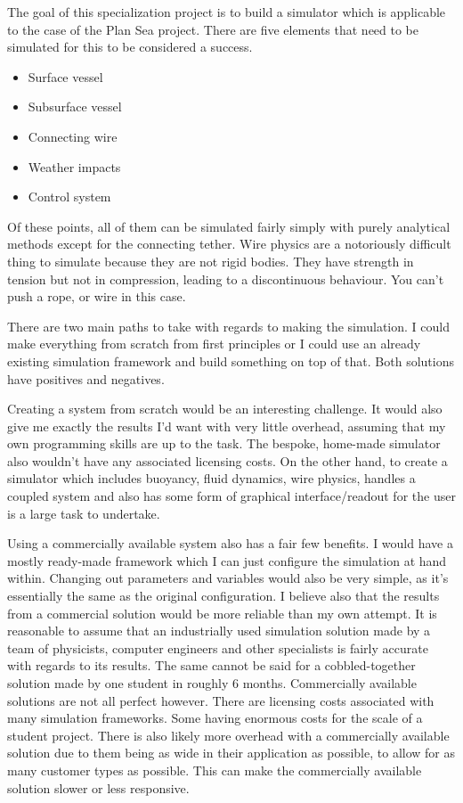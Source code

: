 The goal of this specialization project is to build a simulator which is applicable to the case of the Plan Sea project. There are five elements that need to be simulated for this to be considered a success. 
\begin{itemize}
\item Surface vessel
\item Subsurface vessel
\item Connecting wire
\item Weather impacts
\item Control system
\end{itemize}

Of these points, all of them can be simulated fairly simply with purely  analytical methods except for the connecting tether. Wire physics are a notoriously difficult thing to simulate because they are not rigid bodies. They have strength in tension but not in compression, leading to a discontinuous behaviour. You can't push a rope, or wire in this case. 

There are two main paths to take with regards to making the simulation. I could make everything from scratch from first principles or I could use an already existing simulation framework and build something on top of that. Both solutions have positives and negatives. 

Creating a system from scratch would be an interesting challenge. It would also give me exactly the results I'd want with very little overhead, assuming that my own programming skills are up to the task. The bespoke, home-made simulator also wouldn't have any associated licensing costs. On the other hand, to create a simulator which includes buoyancy, fluid dynamics, wire physics, handles a coupled system and also has some form of graphical interface/readout for the user is a large task to undertake. 

Using a commercially available system also has a fair few benefits. I would have a mostly ready-made framework which I can just configure the simulation at hand within. Changing out parameters and variables would also be very simple, as it's essentially the same as the original configuration. I believe also that the results from a commercial solution would be more reliable than my own attempt. It is reasonable to assume that an industrially used simulation solution made by a team of physicists, computer engineers and other specialists is fairly accurate with regards to its results. The same cannot be said for a cobbled-together solution made by one student in roughly 6 months. Commercially available solutions are not all perfect however. There are licensing costs associated with many simulation frameworks. Some having enormous costs for the scale of a student project. There is also likely more overhead with a commercially available solution due to them being as wide in their application as possible, to allow for as many customer types as possible. This can make the commercially available solution slower or less responsive. 

